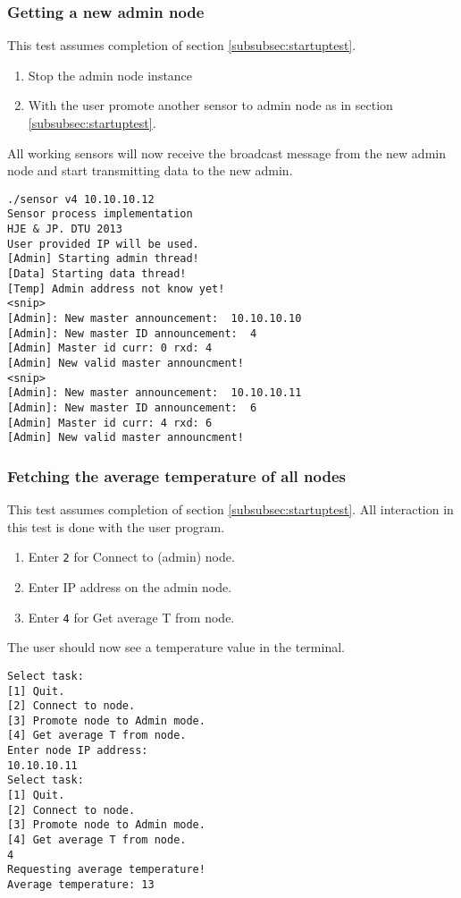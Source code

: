 \subsubsection{Getting a new admin node}
\label{subsubsec:newadmintest}
This test assumes completion of section \ref{subsubsec:startuptest}.
\begin{enumerate}
    \item Stop the admin node instance
    \item With the user promote another sensor to admin node as in section \ref{subsubsec:startuptest}.
\end{enumerate}
All working sensors will now receive the broadcast message from the new admin node and start transmitting data to the new admin.
\begin{verbatim}
./sensor v4 10.10.10.12
Sensor process implementation
HJE & JP. DTU 2013
User provided IP will be used.
[Admin] Starting admin thread!
[Data] Starting data thread!
[Temp] Admin address not know yet!
<snip>
[Admin]: New master announcement:  10.10.10.10
[Admin]: New master ID announcement:  4
[Admin] Master id curr: 0 rxd: 4
[Admin] New valid master announcment!
<snip>
[Admin]: New master announcement:  10.10.10.11
[Admin]: New master ID announcement:  6
[Admin] Master id curr: 4 rxd: 6
[Admin] New valid master announcment!
\end{verbatim}

\subsubsection{Fetching the average temperature of all nodes}
\label{subsubsec:fetchtemptest}
This test assumes completion of section \ref{subsubsec:startuptest}. All interaction in this test is done with the user program.
\begin{enumerate}
    \item Enter \texttt{2} for Connect to (admin) node.
    \item Enter IP address on the admin node.
    \item Enter \texttt{4} for Get average T from node.
\end{enumerate}
The user should now see a temperature value in the terminal.

\begin{verbatim}
Select task:
[1] Quit.
[2] Connect to node.
[3] Promote node to Admin mode.
[4] Get average T from node.
Enter node IP address:
10.10.10.11
Select task:
[1] Quit.
[2] Connect to node.
[3] Promote node to Admin mode.
[4] Get average T from node.
4
Requesting average temperature!
Average temperature: 13
\end{verbatim}
